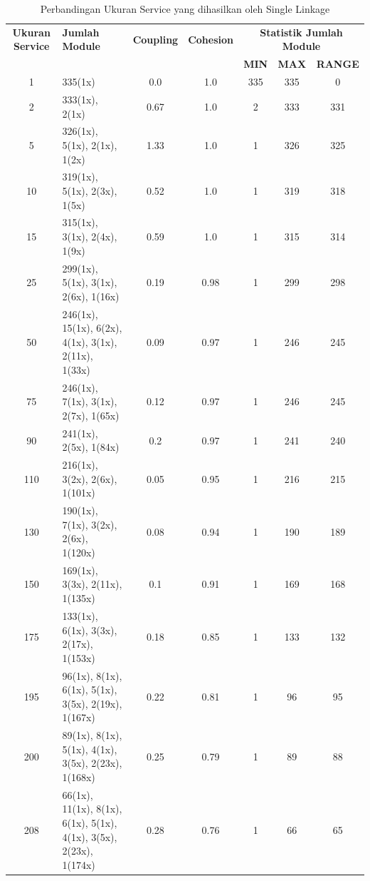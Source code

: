 \begingroup
\setlength{\LTleft}{-20cm plus -1fill}
\setlength{\LTright}{\LTleft}
\begin{small}
\begin{longtable}{|c|p{4cm}|c|c|c|c|c|}
	\caption{Perbandingan Ukuran Service yang dihasilkan oleh Single Linkage}
	\label{tab:service_stat_single} \\
	\hline
	\textbf{Ukuran Service} & \textbf{Jumlah Module} & \textbf{Coupling} & \textbf{Cohesion} & \multicolumn{3}{c|}{\textbf{Statistik Jumlah Module}} \\
	\cline{5-7}
	&  &  &  & \textbf{MIN} & \textbf{MAX} & \textbf{RANGE} \\
	\hline
	\endfirsthead
	\hline  
	1 & 335(1x) & 0.0 & 1.0 & 335 & 335 & 0 \\   \hline
2 & 333(1x), 2(1x) & 0.67 & 1.0 & 2 & 333 & 331 \\   \hline
5 & 326(1x), 5(1x), 2(1x), 1(2x) & 1.33 & 1.0 & 1 & 326 & 325 \\   \hline
10 & 319(1x), 5(1x), 2(3x), 1(5x) & 0.52 & 1.0 & 1 & 319 & 318 \\   \hline
15 & 315(1x), 3(1x), 2(4x), 1(9x) & 0.59 & 1.0 & 1 & 315 & 314 \\   \hline
25 & 299(1x), 5(1x), 3(1x), 2(6x), 1(16x) & 0.19 & 0.98 & 1 & 299 & 298 \\   \hline
50 & 246(1x), 15(1x), 6(2x), 4(1x), 3(1x), 2(11x), 1(33x) & 0.09 & 0.97 & 1 & 246 & 245 \\   \hline
75 & 246(1x), 7(1x), 3(1x), 2(7x), 1(65x) & 0.12 & 0.97 & 1 & 246 & 245 \\   \hline
90 & 241(1x), 2(5x), 1(84x) & 0.2 & 0.97 & 1 & 241 & 240 \\   \hline
110 & 216(1x), 3(2x), 2(6x), 1(101x) & 0.05 & 0.95 & 1 & 216 & 215 \\   \hline
130 & 190(1x), 7(1x), 3(2x), 2(6x), 1(120x) & 0.08 & 0.94 & 1 & 190 & 189 \\   \hline
150 & 169(1x), 3(3x), 2(11x), 1(135x) & 0.1 & 0.91 & 1 & 169 & 168 \\   \hline
175 & 133(1x), 6(1x), 3(3x), 2(17x), 1(153x) & 0.18 & 0.85 & 1 & 133 & 132 \\   \hline
195 & 96(1x), 8(1x), 6(1x), 5(1x), 3(5x), 2(19x), 1(167x) & 0.22 & 0.81 & 1 & 96 & 95 \\   \hline
200 & 89(1x), 8(1x), 5(1x), 4(1x), 3(5x), 2(23x), 1(168x) & 0.25 & 0.79 & 1 & 89 & 88 \\   \hline
208 & 66(1x), 11(1x), 8(1x), 6(1x), 5(1x), 4(1x), 3(5x), 2(23x), 1(174x) & 0.28 & 0.76 & 1 & 66 & 65 \\   \hline

\end{longtable}
\end{small}
